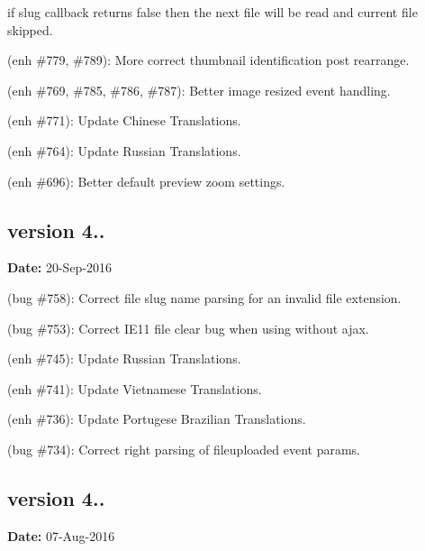 \begin{DoxyItemize}
\begin{DoxyItemize}
\item if slug callback returns {\ttfamily false} then the next file will be read and current file skipped.
\end{DoxyItemize}
\item (enh \#779, \#789)\+: More correct thumbnail identification post rearrange.
\item (enh \#769, \#785, \#786, \#787)\+: Better image resized event handling.
\item (enh \#771)\+: Update Chinese Translations.
\item (enh \#764)\+: Update Russian Translations.
\item (enh \#696)\+: Better default preview zoom settings.
\end{DoxyItemize}

\subsection*{version 4..}

{\bfseries Date\+:} 20-\/\+Sep-\/2016


\begin{DoxyItemize}
\item (bug \#758)\+: Correct file slug name parsing for an invalid file extension.
\item (bug \#753)\+: Correct I\+E11 file clear bug when using without ajax.
\item (enh \#745)\+: Update Russian Translations.
\item (enh \#741)\+: Update Vietnamese Translations.
\item (enh \#736)\+: Update Portugese Brazilian Translations.
\item (bug \#734)\+: Correct right parsing of {\ttfamily fileuploaded} event params.
\end{DoxyItemize}

\subsection*{version 4..}

{\bfseries Date\+:} 07-\/\+Aug-\/2016


